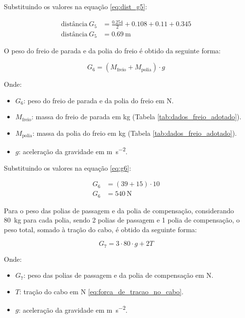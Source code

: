\vspace{1em}

Substituindo os valores na equação \eqref{eq:dist_g5}:

\begin{align*}
  \text{distância} \ G_5 & = \frac{\num{0.254}}{2} + \num{0.108} + \num{0.11} + \num{0.345} \\
  \text{distância} \ G_5 & = \boxed{\SI{0.69}{\meter}}
\end{align*}

O peso do freio de parada e da polia do freio é obtido da seguinte forma:

\begin{equation}
  G_6 = \left( M_{\text{freio}} + M_{\text{polia}} \right) \cdot g
  \label{eq:g6}
\end{equation}

Onde:

\begin{itemize}
  \item $G_6$: peso do freio de parada e da polia do freio em \si{\newton}.
  \item $M_{\text{freio}}$: massa do freio de parada em \si{\kilogram} (Tabela \ref{tab:dados_freio_adotado}).
  \item $M_{\text{polia}}$: massa da polia do freio em \si{\kilogram} (Tabela \ref{tab:dados_freio_adotado}).
  \item $g$: aceleração da gravidade em \si{\meter\per\second\squared}.
\end{itemize}

\vspace{1em}

Substituindo os valores na equação \eqref{eq:g6}:

\begin{align*}
  G_6 & = \left( \num{39} + \num{15} \right) \cdot 10 \\
  G_6 & = \boxed{\SI{540}{\newton}}
\end{align*}

Para o peso das polias de passagem e da polia de compensação, considerando \SI{80}{\kilo\gram} para cada polia, sendo 2 polias de passagem e 1 polia de compensação, o peso total, somado à tração do cabo, é obtido da seguinte forma:

\begin{equation}
  G_7 = 3 \cdot 80 \cdot g + 2 T
  \label{eq:g7}
\end{equation}

Onde:

\begin{itemize}
  \item $G_7$: peso das polias de passagem e da polia de compensação em \si{\newton}.
  \item $T$: tração do cabo em \si{\newton} \eqref{eq:forca_de_tracao_no_cabo}.
  \item $g$: aceleração da gravidade em \si{\meter\per\second\squared}.
\end{itemize}

